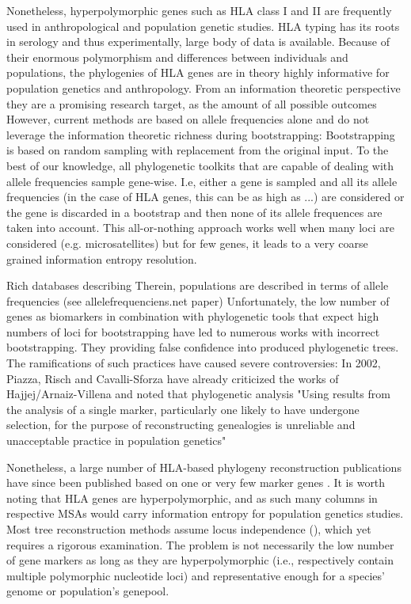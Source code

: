 \documentclass{article}
\begin{document}
Nonetheless, hyperpolymorphic genes such as HLA class I and II are frequently used in anthropological and population genetic studies.
HLA typing has its roots in serology and thus experimentally, large body of data is available.
Because of their enormous polymorphism and differences between individuals and populations, the phylogenies of HLA genes
are in theory highly informative for population genetics and anthropology. From an information theoretic perspective
they are a promising research target, as the amount of all possible outcomes
However, current methods are based on allele frequencies alone and do not leverage the information theoretic richness during bootstrapping:
Bootstrapping is based on random sampling with replacement from the original input. To the best of our knowledge,
all phylogenetic toolkits that are capable of dealing with allele frequencies sample gene-wise.
I.e, either a gene is sampled and all its allele frequencies (in the case of HLA genes, this can be as high as ...)
are considered or the gene is discarded in a bootstrap and then none of its allele frequences are taken into
account. This all-or-nothing approach works well when many loci are considered (e.g. microsatellites)
but for few genes, it leads to a very coarse grained information entropy resolution.

Rich databases describing
Therein, populations are described in terms of allele frequencies (see allelefrequenciens.net paper)
Unfortunately, the low number of genes as biomarkers in combination with phylogenetic tools that expect high numbers of
loci for bootstrapping have led to numerous works with incorrect bootstrapping.
They providing false confidence into produced phylogenetic trees. The ramifications of such practices have caused
severe controversies:
In 2002, Piazza, Risch and Cavalli-Sforza \cite{Risch2002Jan} have already criticized the works of Hajjej/Arnaiz-Villena and noted that
phylogenetic analysis  "Using results from the analysis of a single marker, particularly one likely to
have undergone selection, for the purpose of reconstructing genealogies is unreliable and unacceptable
practice in population genetics"

Nonetheless, a large number of HLA-based phylogeny reconstruction publications have since been  published based on one
or very few marker genes \cite{Hajjej2018Mar,arnaiz2001hla,ArnaizVillena2017Jan,Zhang2012Jun}.
It is worth noting that HLA genes are hyperpolymorphic, and as such many columns in respective MSAs would carry
information entropy for population genetics studies. Most tree reconstruction methods assume locus independence
(\cite{Efron1996Nov}), which yet requires a rigorous examination. The problem is not necessarily the low number of
gene markers as long as they are hyperpolymorphic (i.e., respectively contain multiple polymorphic nucleotide loci)
and representative enough for a species' genome or population's genepool.
\end{document}
